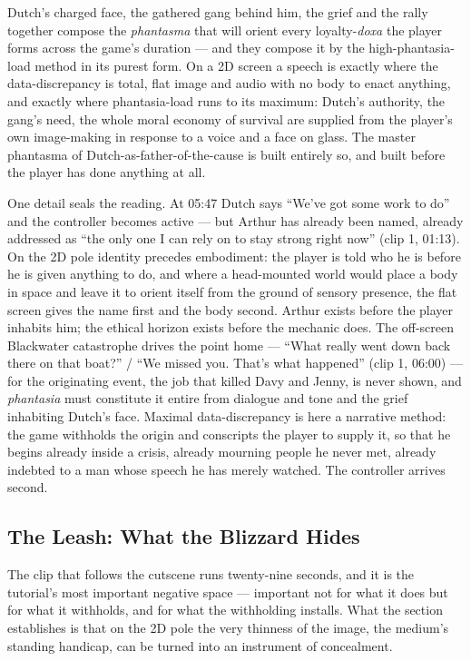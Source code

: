 Dutch's charged face, the gathered gang behind him, the grief and the rally together compose the \textit{phantasma} that will orient every loyalty-\textit{doxa} the player forms across the game's duration — and they compose it by the high-phantasia-load method in its purest form. On a 2D screen a speech is exactly where the data-discrepancy is total, flat image and audio with no body to enact anything, and exactly where phantasia-load runs to its maximum: Dutch's authority, the gang's need, the whole moral economy of survival are supplied from the player's own image-making in response to a voice and a face on glass. The master phantasma of Dutch-as-father-of-the-cause is built entirely so, and built before the player has done anything at all.

One detail seals the reading. At 05:47 Dutch says ``We've got some work to do'' and the controller becomes active — but Arthur has already been named, already addressed as ``the only one I can rely on to stay strong right now'' (clip 1, 01:13). On the 2D pole identity precedes embodiment: the player is told who he is before he is given anything to do, and where a head-mounted world would place a body in space and leave it to orient itself from the ground of sensory presence, the flat screen gives the name first and the body second. Arthur exists before the player inhabits him; the ethical horizon exists before the mechanic does. The off-screen Blackwater catastrophe drives the point home — ``What really went down back there on that boat?'' / ``We missed you. That's what happened'' (clip 1, 06:00) — for the originating event, the job that killed Davy and Jenny, is never shown, and \textit{phantasia} must constitute it entire from dialogue and tone and the grief inhabiting Dutch's face. Maximal data-discrepancy is here a narrative method: the game withholds the origin and conscripts the player to supply it, so that he begins already inside a crisis, already mourning people he never met, already indebted to a man whose speech he has merely watched. The controller arrives second.

\bigskip

\subsection*{The Leash: What the Blizzard Hides}

The clip that follows the cutscene runs twenty-nine seconds, and it is the tutorial's most important negative space — important not for what it does but for what it withholds, and for what the withholding installs. What the section establishes is that on the 2D pole the very thinness of the image, the medium's standing handicap, can be turned into an instrument of concealment.

